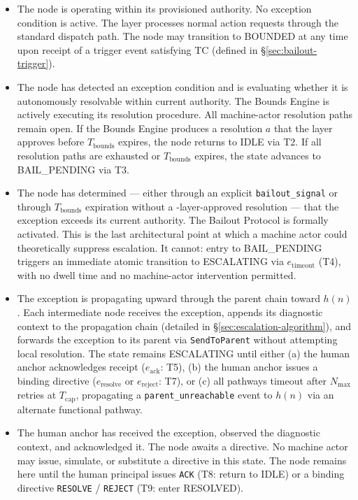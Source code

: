 \begin{itemize}\itemsep0em
\item[\textbf{IDLE.}] The node is operating within its provisioned authority. No exception condition is active. The \fact{} layer processes normal action requests through the standard dispatch path. The node may transition to BOUNDED at any time upon receipt of a trigger event satisfying TC (defined in \S\ref{sec:bailout-trigger}).

\item[\textbf{BOUNDED.}] The node has detected an exception condition and is evaluating whether it is autonomously resolvable within current authority. The Bounds Engine is actively executing its resolution procedure. All machine-actor resolution paths remain open. If the Bounds Engine produces a resolution $a$ that the \fact{} layer approves before $T_{\text{bounds}}$ expires, the node returns to IDLE via T2. If all resolution paths are exhausted or $T_{\text{bounds}}$ expires, the state advances to BAIL\_PENDING via T3.

\item[\textbf{BAIL\_PENDING.}] The node has determined — either through an explicit \texttt{bailout\_signal} or through $T_{\text{bounds}}$ expiration without a \fact-layer-approved resolution — that the exception exceeds its current authority. The Bailout Protocol is formally activated. This is the last architectural point at which a machine actor could theoretically suppress escalation. It cannot: entry to BAIL\_PENDING triggers an immediate atomic transition to ESCALATING via $e_{\text{timeout}}$ (T4), with no dwell time and no machine-actor intervention permitted.

\item[\textbf{ESCALATING.}] The exception is propagating upward through the parent chain toward $h(n)$. Each intermediate node receives the exception, appends its diagnostic context to the propagation chain (detailed in \S\ref{sec:escalation-algorithm}), and forwards the exception to its parent via \texttt{SendToParent} without attempting local resolution. The state remains ESCALATING until either (a) the human anchor acknowledges receipt ($e_{\text{ack}}$: T5), (b) the human anchor issues a binding directive ($e_{\text{resolve}}$ or $e_{\text{reject}}$: T7), or (c) all pathways timeout after $N_{\max}$ retries at $T_{\text{cap}}$, propagating a \texttt{parent\_unreachable} event to $h(n)$ via an alternate functional pathway.

\item[\textbf{HUMAN\_ACKNOWLEDGED.}] The human anchor has received the exception, observed the diagnostic context, and acknowledged it. The node awaits a directive. No machine actor may issue, simulate, or substitute a directive in this state. The node remains here until the human principal issues \texttt{ACK} (T8: return to IDLE) or a binding directive \texttt{RESOLVE} / \texttt{REJECT} (T9: enter RESOLVED).


\end{itemize}
